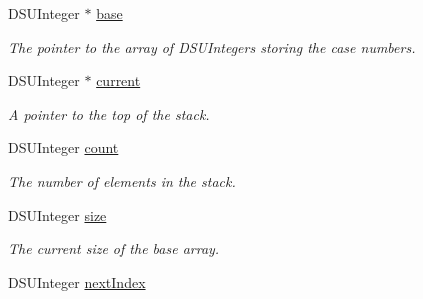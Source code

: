 \begin{DoxyCompactItemize}
\item 
\hypertarget{structds__parallelstack__t_a8add4d29bc25bbbee2f804a4d9707d40}{
DSUInteger $\ast$ \hyperlink{structds__parallelstack__t_a8add4d29bc25bbbee2f804a4d9707d40}{base}}
\label{structds__parallelstack__t_a8add4d29bc25bbbee2f804a4d9707d40}

\begin{DoxyCompactList}\small\item\em The pointer to the array of DSUIntegers storing the case numbers. \item\end{DoxyCompactList}\item 
\hypertarget{structds__parallelstack__t_aff609a2b2facf914d571229fd71fbfa6}{
DSUInteger $\ast$ \hyperlink{structds__parallelstack__t_aff609a2b2facf914d571229fd71fbfa6}{current}}
\label{structds__parallelstack__t_aff609a2b2facf914d571229fd71fbfa6}

\begin{DoxyCompactList}\small\item\em A pointer to the top of the stack. \item\end{DoxyCompactList}\item 
\hypertarget{structds__parallelstack__t_a6e9cf56a395f2344f3c8b59e09d6ae69}{
DSUInteger \hyperlink{structds__parallelstack__t_a6e9cf56a395f2344f3c8b59e09d6ae69}{count}}
\label{structds__parallelstack__t_a6e9cf56a395f2344f3c8b59e09d6ae69}

\begin{DoxyCompactList}\small\item\em The number of elements in the stack. \item\end{DoxyCompactList}\item 
\hypertarget{structds__parallelstack__t_ad8fde692241cfe9be893d63d9cc061a6}{
DSUInteger \hyperlink{structds__parallelstack__t_ad8fde692241cfe9be893d63d9cc061a6}{size}}
\label{structds__parallelstack__t_ad8fde692241cfe9be893d63d9cc061a6}

\begin{DoxyCompactList}\small\item\em The current size of the base array. \item\end{DoxyCompactList}\item 
\hypertarget{structds__parallelstack__t_aae101357fa322c8d155dd03b50a7a13b}{
DSUInteger \hyperlink{structds__parallelstack__t_aae101357fa322c8d155dd03b50a7a13b}{nextIndex}}
\label{structds__parallelstack__t_aae101357fa322c8d155dd03b50a7a13b}


\end{DoxyCompactItemize}
